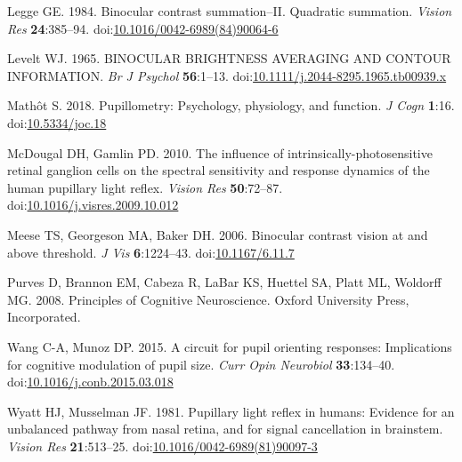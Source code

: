 \documentclass[
]{article}
\newlength{\cslhangindent}
\newlength{\cslentryspacingunit} %
\newenvironment{CSLReferences}[2] %
 {%
  \setlength{\parindent}{0pt}
  \ifodd #1
  \let\oldpar\par
  \def\par{\hangindent=\cslhangindent\oldpar}
  \fi
  \setlength{\parskip}{#2\cslentryspacingunit}
 }%
 {}
\begin{document}
\begin{CSLReferences}{1}{0}
\leavevmode{}%
Legge GE. 1984. Binocular contrast summation--II. Quadratic summation. \emph{Vision Res} \textbf{24}:385--94. doi:\href{https://doi.org/10.1016/0042-6989(84)90064-6}{10.1016/0042-6989(84)90064-6}

\leavevmode{}%
Levelt WJ. 1965. BINOCULAR BRIGHTNESS AVERAGING AND CONTOUR INFORMATION. \emph{Br J Psychol} \textbf{56}:1--13. doi:\href{https://doi.org/10.1111/j.2044-8295.1965.tb00939.x}{10.1111/j.2044-8295.1965.tb00939.x}

\leavevmode{}%
Mathôt S. 2018. Pupillometry: Psychology, physiology, and function. \emph{J Cogn} \textbf{1}:16. doi:\href{https://doi.org/10.5334/joc.18}{10.5334/joc.18}

\leavevmode{}%
McDougal DH, Gamlin PD. 2010. The influence of intrinsically-photosensitive retinal ganglion cells on the spectral sensitivity and response dynamics of the human pupillary light reflex. \emph{Vision Res} \textbf{50}:72--87. doi:\href{https://doi.org/10.1016/j.visres.2009.10.012}{10.1016/j.visres.2009.10.012}

\leavevmode{}%
Meese TS, Georgeson MA, Baker DH. 2006. Binocular contrast vision at and above threshold. \emph{J Vis} \textbf{6}:1224--43. doi:\href{https://doi.org/10.1167/6.11.7}{10.1167/6.11.7}

\leavevmode{}%
Purves D, Brannon EM, Cabeza R, LaBar KS, Huettel SA, Platt ML, Woldorff MG. 2008. Principles of {Cognitive} {Neuroscience}. Oxford University Press, Incorporated.

\leavevmode{}%
Wang C-A, Munoz DP. 2015. A circuit for pupil orienting responses: Implications for cognitive modulation of pupil size. \emph{Curr Opin Neurobiol} \textbf{33}:134--40. doi:\href{https://doi.org/10.1016/j.conb.2015.03.018}{10.1016/j.conb.2015.03.018}

\leavevmode{}%
Wyatt HJ, Musselman JF. 1981. Pupillary light reflex in humans: Evidence for an unbalanced pathway from nasal retina, and for signal cancellation in brainstem. \emph{Vision Res} \textbf{21}:513--25. doi:\href{https://doi.org/10.1016/0042-6989(81)90097-3}{10.1016/0042-6989(81)90097-3}

\end{CSLReferences}
\end{document}
